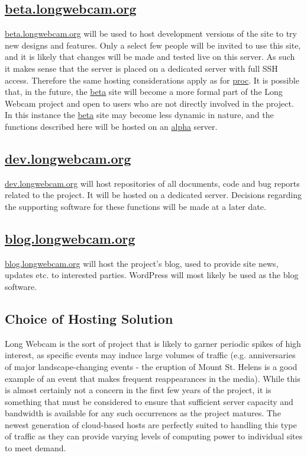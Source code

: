\documentclass[11pt]{article}
\begin{document}
\subsection{\protect\url{beta.longwebcam.org}}
\url{beta.longwebcam.org} will be used to host development versions of the site to try new designs and features. Only a select few people will be invited to use this site, and it is likely that changes will be made and tested live on this server. As such it makes sense that the server is placed on a dedicated server with full SSH access. Therefore the same hosting considerations apply as for \url{proc}. It is possible that, in the future, the \url{beta} site will become a more formal part of the Long Webcam project and open to users who are not directly involved in the project. In this instance the \url{beta} site may become less dynamic in nature, and the functions described here will be hosted on an \url{alpha} server.

\subsection{\protect\url{dev.longwebcam.org}}
\url{dev.longwebcam.org} will host repositories of all documents, code and bug reports related to the project. It will be hosted on a dedicated server. Decisions regarding the supporting software for these functions will be made at a later date.

\subsection{\protect\url{blog.longwebcam.org}}
\url{blog.longwebcam.org} will host the project's blog, used to provide site news, updates etc. to interested parties. WordPress will most likely be used as the blog software.

\subsection{Choice of Hosting Solution}
Long Webcam is the sort of project that is likely to garner periodic spikes of high interest, as specific events may induce large volumes of traffic (e.g. anniversaries of major landscape-changing events - the eruption of Mount St. Helens is a good example of an event that makes frequent reappearances in the media). While this is almost certainly not a concern in the first few years of the project, it is something that must be considered to ensure that sufficient server capacity and bandwidth is available for any such occurrences as the project matures. The newest generation of cloud-based hosts are perfectly suited to handling this type of traffic as they can provide varying levels of computing power to individual sites to meet demand.
\end{document}
